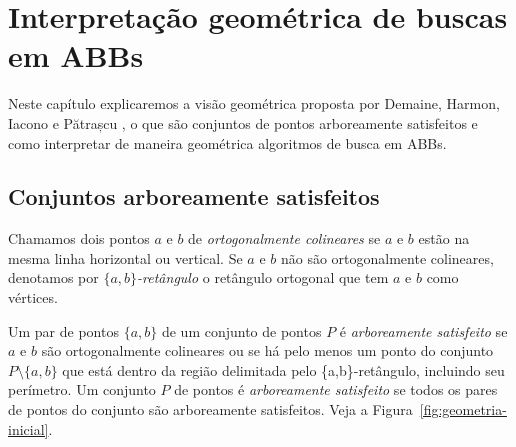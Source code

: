 
\chapter{Interpretação geométrica de buscas em ABBs}
\label{cap:geometria}

Neste capítulo explicaremos a visão geométrica proposta por Demaine, Harmon, Iacono e Pătrașcu \cite{geometry_of_bst}, o que são conjuntos de pontos arboreamente satisfeitos e como interpretar de maneira geométrica algoritmos de busca em ABBs.

\section{Conjuntos arboreamente satisfeitos}

Chamamos dois pontos $a$ e $b$ de \textit{ortogonalmente colineares} se $a$ e $b$ estão na mesma linha horizontal ou vertical. Se $a$ e $b$ não são ortogonalmente colineares, denotamos por \textit{$\{a,b\}$-retângulo} o retângulo ortogonal que tem $a$ e $b$ como vértices.

Um par de pontos $\{a,b\}$ de um conjunto de pontos $P$ é \textit{arboreamente satisfeito} se $a$ e $b$ são ortogonalmente colineares ou se há pelo menos um ponto do conjunto \( P \setminus \{a,b\} \) que está dentro da região delimitada pelo \{a,b\}-retângulo, incluindo seu perímetro. Um conjunto $P$ de pontos é \textit{arboreamente satisfeito} se todos os pares de pontos do conjunto são arboreamente satisfeitos. Veja a Figura~\ref{fig:geometria-inicial}.

